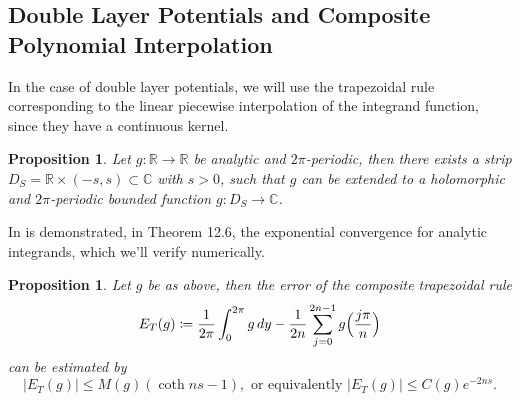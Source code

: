 \documentclass[10pt, a4paper, twoside, openright]{book}
\theoremstyle{definition}
\theoremstyle{plain}
\theoremstyle{plain}
\theoremstyle{plain}
\newtheorem{proposition}[subsection]{Proposition}
\theoremstyle{plain}
\theoremstyle{plain}
\theoremstyle{plain}
\theoremstyle{plain}
\theoremstyle{plain}
\begin{document}
\subsection{Double Layer Potentials and Composite Polynomial Interpolation}
In the case of double layer potentials, we will use the trapezoidal rule 
corresponding to the linear piecewise interpolation of the integrand function, 
since they have a continuous kernel.
\begin{proposition}
 Let $g:\mathbb{R}\to\mathbb{R}$ be analytic and $2\pi$-periodic, then there exists a strip $D_S=\mathbb{R}\times(-s, s)\subset\mathbb{C}$ with $s>0$, such that
 $g$ can be extended to a holomorphic and $2\pi$-periodic bounded function $g:D_S\to\mathbb{C}$.
\end{proposition}
In \cite{kress:book} is demonstrated, in Theorem 12.6, the exponential 
convergence for analytic integrands, which we'll verify numerically.
\begin{proposition}
 Let $g$ be as above, then the error of the composite trapezoidal rule
 \begin{equation}
  E_T(g)\coloneqq \frac{1}{2\pi}\int_0^{2\pi}g\,dy - \frac{1}{2n}\sum_{j=0}^{2n-1}g\Bigl(\frac{j\pi}{n}\Bigr)
 \end{equation}
 can be estimated by 
 \begin{equation}
  |E_T(g)|\leq M(g)(\coth ns -1), \text{ or equivalently }  |E_T(g)|\leq C(g) e^{-2ns}.
 \end{equation}
\end{proposition}
\end{document}

